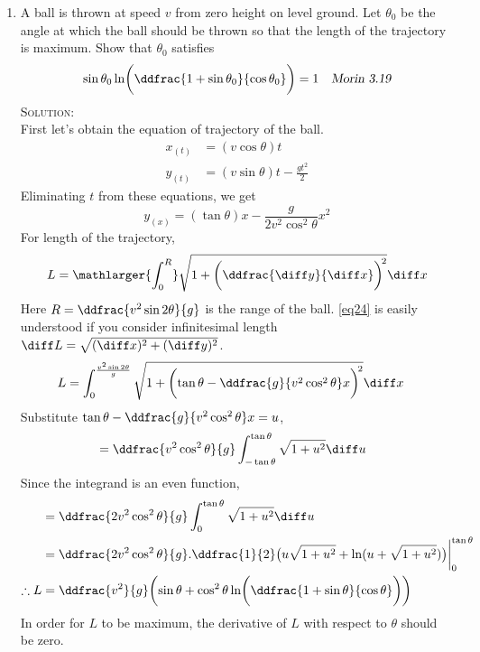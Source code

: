 \begin{enumerate}

\item A ball is thrown at speed $v$ from zero height on level ground. Let $\theta_0$ be the angle at which the ball should be thrown so that the length of the trajectory is maximum. Show that $\theta_0$ satisfies
\begin{align*}
\sin\theta_0\ln\biggl(\ddfrac{1+\sin\theta_0}{\cos\theta_0}\biggr)=1  &&\textsl{Morin 3.19}
\end{align*}
\textsc{Solution:}\\
First let's obtain the equation of trajectory of the ball.
\begin{align*}
x_{(t)}&=(v\cos\theta)t\\
y_{(t)}&=(v\sin\theta)t-\frac{gt^2}{2}
\end{align*}
Eliminating $t$ from these equations, we get
\begin{equation*}
y_{(x)}=(\tan\theta)x-\frac{g}{2v^2\cos^2\theta}x^2
\end{equation*}
For length of the trajectory, 
\begin{equation} \label{eq24}
L=\mathlarger{ \int_0^R} \sqrt{1+\biggl(\ddfrac{\diff y}{\diff x} \biggr)^{\!2}} \diff x
\end{equation}
Here $R=\ddfrac{v^2\sin2\theta}{g}$ is the range of the ball. \eqref{eq24} is easily understood if you consider infinitesimal length $\diff L = \sqrt{(\diff x)^2+(\diff y)^2}$.
\begin{align}
L&=\int_0^{\frac{v^2\sin2\theta}{g}} \sqrt{1+\biggl( \tan\theta - \ddfrac{g}{v^2\cos^2\theta}x\biggr)^{\!2}} \diff x \nonumber
\end{align}
Substitute $\tan\theta-\ddfrac{g}{v^2\cos^2\theta}x=u$,
\begin{align}
&= \ddfrac{v^2\cos^2\theta}{g}\int_{-\tan\theta}^{\tan\theta} \sqrt{1+u^2} \diff u \nonumber
\end{align}
Since the integrand is an even function,
\begin{align}
&= \ddfrac{2v^2\cos^2\theta}{g}\int_0^{\tan\theta} \sqrt{1+u^2} \diff u \nonumber\\
&= \ddfrac{2v^2\cos^2\theta}{g}.\ddfrac{1}{2} \bigl(u\sqrt{1+u^2}+\ln(u+\sqrt{1+u^2}) \bigr)\biggr|_0^{\tan\theta} \nonumber\\
\therefore L &= \ddfrac{v^2}{g}\biggl(\sin\theta + \cos^2\theta\ln\biggl(\ddfrac{1+\sin\theta}{\cos\theta} \biggr) \biggr) \label{eq25}
\end{align}
In order for $L$ to be maximum, the derivative of $L$ with respect to $\theta$ should be zero.

\end{enumerate}
